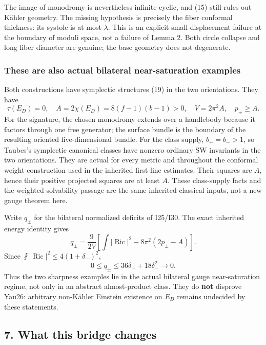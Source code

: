 \documentclass[
  11pt,
]{article}
\begin{document}
The image of monodromy is nevertheless infinite cyclic, and (15) still
rules out Kähler geometry. The missing hypothesis is precisely the fiber
conformal thickness: its systole is at most \(\lambda\). This is an
explicit small-displacement failure at the boundary of moduli space, not
a failure of Lemma 2. Both circle collapse and long fiber diameter are
genuine; the base geometry does not degenerate.

\hypertarget{these-are-also-actual-bilateral-near-saturation-examples}{%
\subsubsection{These are also actual bilateral near-saturation
examples}\label{these-are-also-actual-bilateral-near-saturation-examples}}

Both constructions have symplectic structures (19) in the two
orientations. They have \[
 \tau(E_D)=0,\quad A=2\chi(E_D)=8(f-1)(b-1)>0,
 \quad V=2\pi^2A,
 \quad p_\pm\ge A.
\tag{27}
\] For the signature, the chosen monodromy extends over a handlebody
because it factors through one free generator; the surface bundle is the
boundary of the resulting oriented five-dimensional bundle. For the
class supply, \(b_+=b_->1\), so Taubes's symplectic canonical classes
have nonzero ordinary SW invariants in the two orientations. They are
actual for every metric and throughout the conformal weight construction
used in the inherited first-line estimates. Their squares are \(A\),
hence their positive projected squares are at least \(A\). These
class-supply facts and the weighted-solvability passage are the same
inherited classical inputs, not a new gauge theorem here.

Write \(q_\pm\) for the bilateral normalized deficits of I25/I30. The
exact inherited energy identity gives \[
 q_\pm=\frac9{2V}
       \left[\int|\operatorname{Ric}|^2-8\pi^2(2p_\pm-A)\right].
\] Since \(\fint|\operatorname{Ric}|^2\le4(1+\delta_-)^2\), \[
                    0\le q_\pm\le36\delta_-+18\delta_-^2\to0.
\tag{28}
\] Thus the two sharpness examples lie in the actual bilateral gauge
near-saturation regime, not only in an abstract almost-product class.
They do \textbf{not} disprove Yau26: arbitrary non-Kähler Einstein
existence on \(E_D\) remains undecided by these statements.

\hypertarget{what-this-bridge-changes}{%
\subsection{7. What this bridge
changes}\label{what-this-bridge-changes}}
\end{document}
